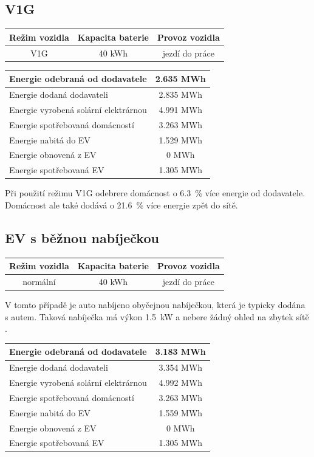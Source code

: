 \documentclass[12pt,a4paper]{Cotmas-2018}
\begin{document}
\subsection{V1G}

\bigskip
\begin{tabular}{ | c | c | c | }
\hline
Režim vozidla & Kapacita baterie & Provoz vozidla \\
\hline
V1G & 40 kWh & jezdí do práce \\
\hline
\end{tabular}
\bigskip

\bigskip
\begin{tabular}{ | l | c | }
\hline
Energie odebraná od dodavatele & 2.635 MWh \\
\hline
Energie dodaná dodavateli & 2.835 MWh \\
\hline
Energie vyrobená solární elektrárnou & 4.991 MWh \\
\hline
Energie spotřebovaná domácností & 3.263 MWh \\
\hline
Energie nabitá do EV & 1.529 MWh \\
\hline
Energie obnovená z EV & 0 MWh \\
\hline
Energie spotřebovaná EV & 1.305 MWh \\
\hline
\end{tabular}
\bigskip

Při použití režimu V1G odebrere domácnost o 6.3~\% více energie od dodavatele.
Domácnost ale také dodává o 21.6~\% více energie zpět do sítě.

\subsection{EV s běžnou nabíječkou}

\bigskip
\begin{tabular}{ | c | c | c | }
\hline
Režim vozidla & Kapacita baterie & Provoz vozidla \\
\hline
normální & 40 kWh & jezdí do práce \\
\hline
\end{tabular}
\bigskip

V tomto případě je auto nabíjeno obyčejnou nabíječkou, která je typicky dodána s autem.
Taková nabíječka má výkon 1.5~kW a nebere žádný ohled na zbytek sítě \cite{Svarc-2022}.

\bigskip
\begin{tabular}{ | l | c | }
\hline
Energie odebraná od dodavatele & 3.183 MWh \\
\hline
Energie dodaná dodavateli & 3.354 MWh \\
\hline
Energie vyrobená solární elektrárnou & 4.992 MWh \\
\hline
Energie spotřebovaná domácností & 3.263 MWh \\
\hline
Energie nabitá do EV & 1.559 MWh \\
\hline
Energie obnovená z EV & 0 MWh \\
\hline
Energie spotřebovaná EV & 1.305 MWh \\
\hline
\end{tabular}
\bigskip
\end{document}
